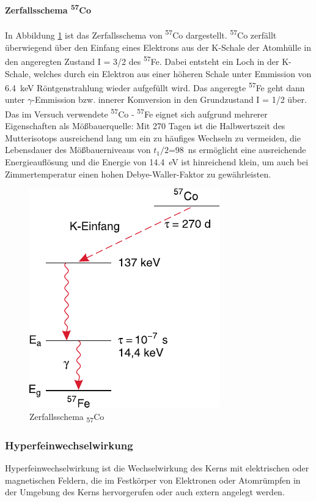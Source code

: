 \documentclass[a4paper,twoside,final]{article}
\begin{document}
\paragraph{Zerfallsschema \textsuperscript{57}Co}
In Abbildung \ref{fig:zerfallsschema} ist das Zerfallsschema von \textsuperscript{57}Co dargestellt. \textsuperscript{57}Co zerfällt überwiegend über den Einfang eines Elektrons aus der K-Schale der Atomhülle in den angeregten Zustand I = 3/2 des \textsuperscript{57}Fe. Dabei entsteht ein Loch in der K-Schale, welches durch ein Elektron aus einer höheren Schale unter Emmission von \SI{6,4}{\keV} Röntgenstrahlung wieder aufgefüllt wird. Das angeregte \textsuperscript{57}Fe geht dann unter $\gamma$-Emmission bzw. innerer Komversion in den Grundzustand I = 1/2 über.\\
Das im Versuch verwendete \textsuperscript{57}Co - \textsuperscript{57}Fe eignet sich aufgrund mehrerer Eigenschaften als Mößbauerquelle: Mit 270 Tagen ist die Halbwertszeit des Mutterisotops ausreichend lang um ein zu häufiges Wechseln zu vermeiden, die Lebensdauer des Mößbauerniveaus von $t_1/2$=\SI{98}{\nano\second} ermöglicht eine ausreichende Energieauflösung und die Energie von \SI{14,4}{\electronvolt} ist hinreichend klein, um auch bei Zimmertemperatur einen hohen Debye-Waller-Faktor zu gewährleisten.


\begin{figure}[htp]
    \centering
    \includegraphics{Bilder/Zerfallsschema_Kobalt.pdf}
    \caption{Zerfallsschema \textsubscript{57}Co}
    \label{fig:zerfallsschema}
\end{figure}


\subsubsection{Hyperfeinwechselwirkung}
Hyperfeinwechselwirkung ist die Wechselwirkung des Kerns mit elektrischen oder magnetischen Feldern, die im Festkörper von Elektronen oder Atomrümpfen in der Umgebung des Kerns hervorgerufen oder auch extern angelegt werden.
\end{document}
